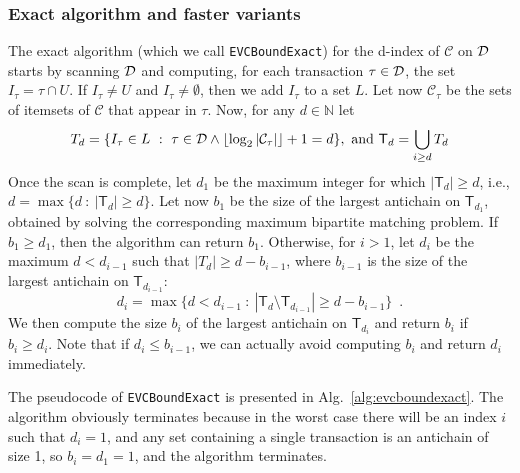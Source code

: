 \subsubsection{Exact algorithm and faster variants}\label{sec:computvcexact}
The exact algorithm (which we call \texttt{EVCBoundExact}) for the d-index of
$\mathcal{C}$ on ${\cal D}$ starts by scanning ${\cal D}$ and computing, for each
transaction $\tau\in{\cal D}$, the set $I_\tau=\tau\cap U$. If $I_\tau\neq U$ and
$I_\tau\neq\emptyset$, then we add $I_\tau$ to a set $L$. Let now
$\mathcal{C}_\tau$ be the sets of itemsets of $\mathcal{C}$ that appear in
$\tau$. Now, for any $d\in\mathbb{N}$ let
\[
	T_d=\{I_\tau\in L ~:~ \tau\in{\cal D} \wedge \lfloor\log_2|\mathcal{C}_\tau|\rfloor+1= d\},\mbox{ and } \mathsf{T}_d=\bigcup_{i\ge d} T_d
\]
Once the scan is complete, let $d_1$  be the maximum integer for which
$|\mathsf{T}_d|\ge d$, i.e., $d=\max\{d ~:~ |\mathsf{T}_d|\ge d\}$. Let now
$b_1$ be the size of the largest antichain on $\mathsf{T}_{d_1}$, obtained by
solving the corresponding maximum bipartite matching problem. If $b_1\ge d_1$,
then the algorithm can return $b_1$. Otherwise, for $i>1$, let $d_i$ be the
maximum $d<d_{i-1}$ such that $|T_d|\ge d-b_{i-1}$, where $b_{i-1}$ is the size
of the largest antichain on $\mathsf{T}_{d_{i-1}}$:
\[
	d_i=\max\{d<d_{i-1} ~:~ |\mathsf{T}_d\setminus\mathsf{T}_{d_{i-1}}|\ge d-b_{i-1}\}\enspace.
\]
We then compute the size $b_i$ of the largest antichain on $\mathsf{T}_{d_i}$
and return $b_i$ if $b_i\ge d_i$. Note that if $d_i\le b_{i-1}$, we can actually
avoid computing $b_i$ and return $d_i$ immediately.

The pseudocode of \texttt{EVCBoundExact} is presented in
Alg.~\ref{alg:evcboundexact}. The algorithm obviously terminates because in the
worst case there will be an index $i$ such that $d_i=1$, and any set containing
a single transaction is an antichain of size 1, so $b_i=d_1=1$, and the
algorithm terminates.

